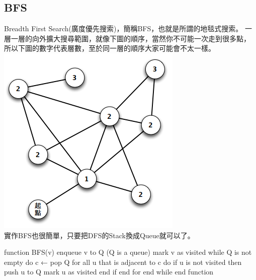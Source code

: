 \documentclass{article}
\begin{document}
\subsection{BFS}
Breadth First Search(廣度優先搜索)，簡稱BFS，也就是所謂的地毯式搜索。
一層一層的向外擴大搜尋範圍，就像下圖的順序，當然你不可能一次走到很多點，
所以下圖的數字代表層數，至於同一層的順序大家可能會不太一樣。\\
\includegraphics[width=0.5\columnwidth]{BFS.png}\\
實作BFS也很簡單，只要把DFS的Stack換成Queue就可以了。
\begin{algorithm}[caption={BFS}, label={alg1}]
function BFS(v)
    enqueue v to Q (Q is a queue)
    mark v as visited
    while Q is not empty do
        c ← pop Q
        for all u that is adjacent to c do
            if u is not visited then
                push u to Q
                mark u as visited
            end if
        end for
    end while
end function
\end{algorithm}



\end{document}
